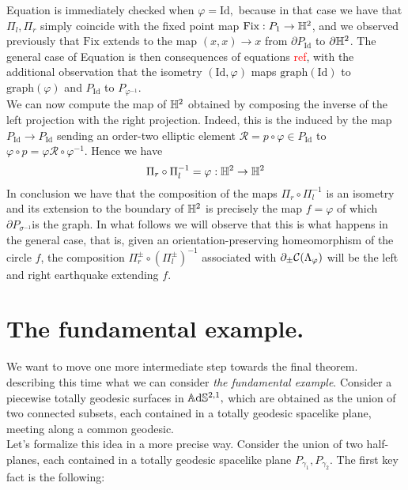 Equation  is immediately checked when $\varphi=\text{Id},$ because in that case we have that $\Pi_l,\Pi_r$ simply coincide with the fixed point map $\text{Fix}:P_1\to\mathbb{H}^2$, and we observed previously that $\text{Fix}$ extends to the map $(x,x)\to x$ from $\partial P_{\text{Id}}$ to $\partial\mathbb{H}^2$. The general case of Equation  is then consequences of equations \textcolor{red}{ref}, with the additional observation that the isometry $(\text{Id},\varphi)$ maps $\text{graph}(\text{Id})$ to $\text{graph}(\varphi)$ and $P_\text{Id}$ to $P_{\varphi^{-1}}$. \\
We can now compute the map of $\mathbb{H}^2$ obtained by composing the inverse of the left projection with the right projection. Indeed, this is the induced by the map $P_{\text{Id}}\to P_\text{Id}$ sending an order-two elliptic element $\mathcal{R}=p\circ\varphi\in P_{\text{Id}}$ to $\varphi\circ p=\varphi\mathcal{R}\circ\varphi^{-1}$. Hence we have   
\begin{equation}\label{composition}
    \Pi_r\circ\Pi_l^{-1}=\varphi:\mathbb{H}^2\to\mathbb{H}^2
\end{equation}
In conclusion we have that the composition of the maps $\Pi_r\circ\Pi_l^{-1}$ is an isometry and its extension to the boundary of $\mathbb{H}^2$ is precisely the map $f=\varphi$ of which $\partial P_{\sigma^{-1}}$is the graph. In what follows we will observe that this is what happens in the general case, that is, given an orientation-preserving homeomorphism of the circle $f$, the composition $\Pi_r^\pm\circ(\Pi_l^\pm)^{-1}$ associated with $\partial_\pm\mathcal{C}(\Lambda_\varphi)$ will be the left and right earthquake extending $f$.

\section{The fundamental example.} We want to move one more intermediate step towards the final theorem. describing this time what we can consider \textit{the fundamental example}. Consider a piecewise totally geodesic surfaces in $\mathbb{A}\mathrm{d}\mathbb{S}^{2,1},$ which are obtained as the union of two connected subsets, each contained in a totally geodesic spacelike plane, meeting along a common geodesic. \\
Let's formalize this idea in a more precise way. Consider the union of two half-planes, each contained in a totally geodesic spacelike plane $P_{\gamma_1},P_{\gamma_2}$. The first key fact is the following:

